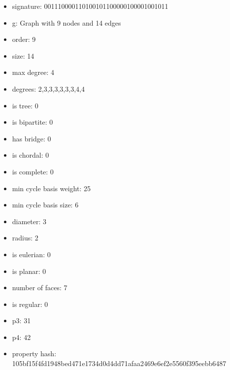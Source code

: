 \newpage
\begin{figure}
\end{figure}
\begin{itemize}
\item signature: 001110000110100101100000100001001011
\item g: Graph with 9 nodes and 14 edges
\item order: 9
\item size: 14
\item max degree: 4
\item degrees: 2,3,3,3,3,3,3,4,4
\item is tree: 0
\item is bipartite: 0
\item has bridge: 0
\item is chordal: 0
\item is complete: 0
\item min cycle basis weight: 25
\item min cycle basis size: 6
\item diameter: 3
\item radius: 2
\item is eulerian: 0
\item is planar: 0
\item number of faces: 7
\item is regular: 0
\item p3: 31
\item p4: 42
\item property hash: 105bf15f4fd1948bed471e1734d0d4dd71afaa2469e6ef2e5560f395eebb6487
\end{itemize}
\newpage
